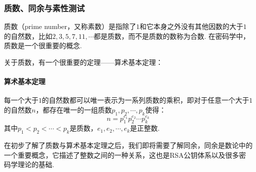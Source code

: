 \documentclass{article}
\numberwithin{equation}{subsubsection}
\begin{document}
\subsubsection{质数、同余与素性测试}
质数（prime number，又称素数）是指除了$1$和它本身之外没有其他因数的大于$1$的自然数，比如$2,3,5,7,11,\cdots$都是质数，而不是质数的数称为合数.
在密码学中，质数是一个很重要的概念.\par
关于质数，有一个很重要的定理——算术基本定理：
\paragraph{\textbf{算术基本定理}}
每一个大于$1$的自然数都可以唯一表示为一系列质数的乘积，即对于任意一个大于$1$的自然数$n$，都存在唯一的一组质数$p_1,p_2,\cdots,p_k$使得：
\begin{equation}
    n=p_1^{e_1}p_2^{e_2}\cdots p_k^{e_k}
    \nonumber
\end{equation}
其中$p_1<p_2<\cdots<p_k$是质数，$e_1,e_2,\cdots,e_k$是正整数.\par
在初步了解了质数与算术基本定理之后，我们即将需要了解同余，同余是数论中的一个重要概念，它描述了整数之间的一种关系，这也是RSA公钥体系以及很多密码学理论的基础.\par
\end{document}

